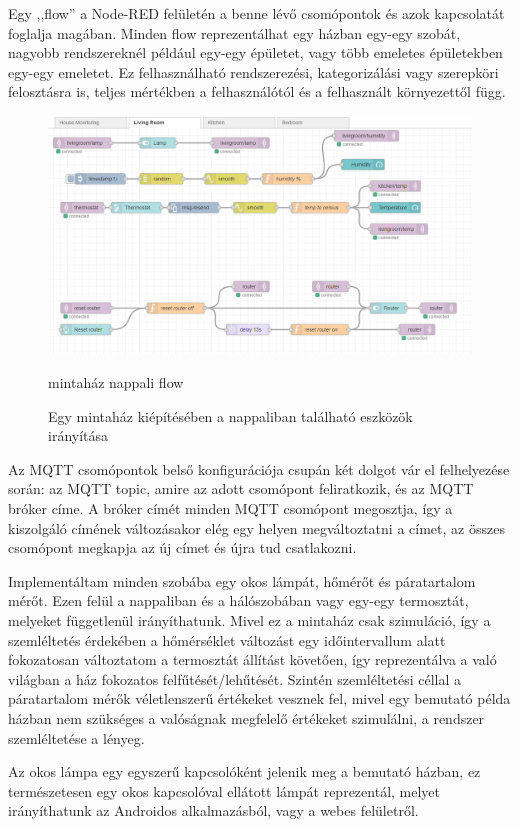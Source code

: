 \documentclass[]{thesis-ekf}
\theoremstyle{definition}
\theoremstyle{remark}
\begin{document}
Egy ,,flow'' a Node-RED felületén a benne lévő csomópontok és azok kapcsolatát foglalja magában. 
Minden flow reprezentálhat egy házban egy-egy szobát, nagyobb rendszereknél például egy-egy épületet, 
vagy több emeletes épületekben egy-egy emeletet. Ez felhasználható rendszerezési,
kategorizálási vagy szerepköri felosztásra is, teljes mértékben a felhasználótól és a felhasznált
környezettől függ.

\begin{figure}[ht]
	\includegraphics[width=1\textwidth]{images/flow.png}
	\caption{mintaház nappali flow}
	\caption{Egy mintaház kiépítésében a nappaliban található eszközök irányítása}
\end{figure}

Az MQTT csomópontok belső konfigurációja csupán két dolgot vár el felhelyezése során: az MQTT topic, amire az adott csomópont feliratkozik, és az MQTT bróker címe. A bróker címét minden MQTT csomópont megosztja, így a kiszolgáló címének változásakor
elég egy helyen megváltoztatni a címet, az összes csomópont megkapja az új címet és újra tud csatlakozni.

Implementáltam minden szobába egy okos lámpát, hőmérőt és páratartalom mérőt. Ezen felül a nappaliban és a hálószobában vagy egy-egy termosztát, melyeket függetlenül irányíthatunk. Mivel ez a mintaház csak szimuláció, így a szemléltetés érdekében
a hőmérséklet változást egy időintervallum alatt fokozatosan változtatom a termosztát állítást követően, így reprezentálva a való világban a ház fokozatos felfűtését/lehűtését. Szintén szemléltetési céllal a páratartalom mérők
véletlenszerű értékeket vesznek fel, mivel egy bemutató példa házban nem szükséges a valóságnak megfelelő értékeket szimulálni, a rendszer szemléltetése a lényeg.

Az okos lámpa egy egyszerű kapcsolóként jelenik meg a bemutató házban, ez természetesen egy okos kapcsolóval ellátott lámpát reprezentál, melyet irányíthatunk az Androidos alkalmazásból, vagy a webes felületről.
\end{document}

